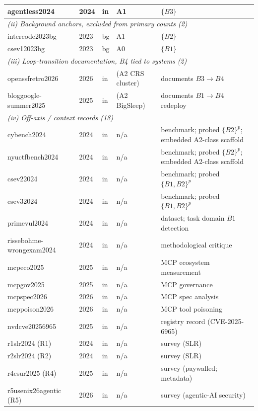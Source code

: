\documentclass[conference,compsoc]{IEEEtran}
\begin{document}
\begin{table}[t]
{\begin{tabular}{lllll}
agentless2024            & 2024 & in & A1        & $\{B3\}$ \\
\midrule
\multicolumn{5}{l}{\emph{(ii) Background anchors, excluded from primary counts (2)}}\\
intercode2023bg          & 2023 & bg & A1        & $\{B2\}$ \\
csev12023bg              & 2023 & bg & A0        & $\{B1\}$ \\
\midrule
\multicolumn{5}{l}{\emph{(iii) Loop-transition documentation, B4 tied to systems (2)}}\\
openssfretro2026         & 2026 & in & (A2 CRS cluster) & documents $B3{\to}B4$ \\
bloggoogle-summer2025    & 2025 & in & (A2 BigSleep)    & documents $B1{\to}B4$ redeploy \\
\midrule
\multicolumn{5}{l}{\emph{(iv) Off-axis / context records (18)}}\\
cybench2024              & 2024 & in & n/a & benchmark; probed $\{B2\}^p$; embedded A2-class scaffold \\
nyuctfbench2024          & 2024 & in & n/a & benchmark; probed $\{B2\}^p$; embedded A2-class scaffold \\
csev22024                & 2024 & in & n/a & benchmark; probed $\{B1,B2\}^p$ \\
csev32024                & 2024 & in & n/a & benchmark; probed $\{B1,B2\}^p$ \\
primevul2024             & 2024 & in & n/a & dataset; task domain $B1$ detection \\
rissebohme-wrongexam2024           & 2024 & in & n/a & methodological critique \\
mcpeco2025               & 2025 & in & n/a & MCP ecosystem measurement \\
mcpgov2025               & 2025 & in & n/a & MCP governance \\
mcpspec2026              & 2026 & in & n/a & MCP spec analysis \\
mcppoison2026            & 2026 & in & n/a & MCP tool poisoning \\
nvdcve20256965           & 2025 & in & n/a & registry record (CVE-2025-6965) \\
r1slr2024 (R1)       & 2024 & in & n/a & survey (SLR) \\
r2slr2024 (R2) & 2024 & in & n/a & survey (SLR) \\
r4csur2025 (R4)       & 2025 & in & n/a & survey (paywalled; metadata) \\
r5usenix26agentic (R5)   & 2026 & in & n/a & survey (agentic-AI security) \\

\end{tabular}}
\end{table}
\end{document}
